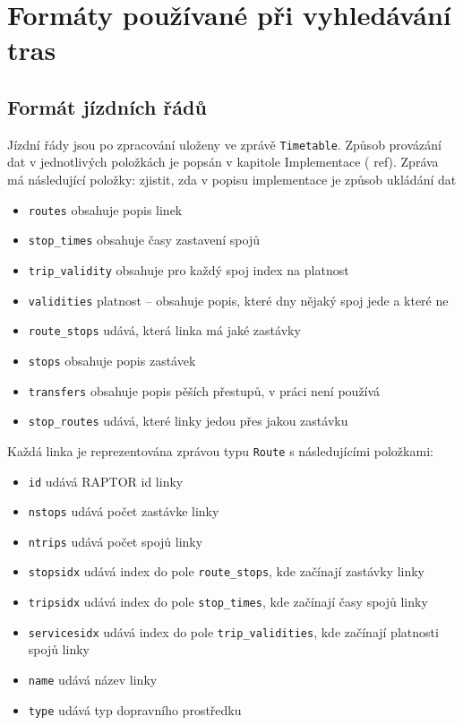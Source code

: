 \section{Formáty používané při vyhledávání tras}
\label{ch:formaty-dat:vyhledavani}
\subsection{Formát jízdních řádů}
Jízdní řády jsou po zpracování uloženy ve zprávě {\tt Timetable}. Způsob
provázání dat v jednotlivých položkách je popsán v kapitole Implementace (\TODO
ref). Zpráva má následující položky:
\TODO zjistit, zda v popisu implementace je způsob ukládání dat
\begin{itemize}
	\item {\tt routes} obsahuje popis linek
	\item {\tt stop\_times} obsahuje časy zastavení spojů 
	\item {\tt trip\_validity} obsahuje pro každý spoj index na platnost 
	\item {\tt validities} platnost -- obsahuje popis, které dny nějaký spoj
	jede a které ne 
	\item {\tt route\_stops} udává, která linka má jaké zastávky 
	\item {\tt stops} obsahuje popis zastávek
	\item {\tt transfers} obsahuje popis pěších přestupů, v práci není
	používá 
	\item {\tt stop\_routes} udává, které linky jedou přes jakou zastávku
\end{itemize} 
Každá linka je reprezentována zprávou typu {\tt Route} s následujícími
položkami:
\begin{itemize}
	\item {\tt id} udává RAPTOR id linky 
	\item {\tt nstops} udává počet zastávke linky
	\item {\tt ntrips} udává počet spojů linky
	\item {\tt stopsidx} udává index do pole {\tt route\_stops}, kde
	začínají zastávky linky
	\item {\tt tripsidx} udává index do pole {\tt stop\_times}, kde
	začínají časy spojů linky
	\item {\tt servicesidx} udává index do pole {\tt trip\_validities}, kde
	začínají platnosti spojů linky
	\item {\tt name} udává název linky
	\item {\tt type} udává typ dopravního prostředku
\end{itemize}
